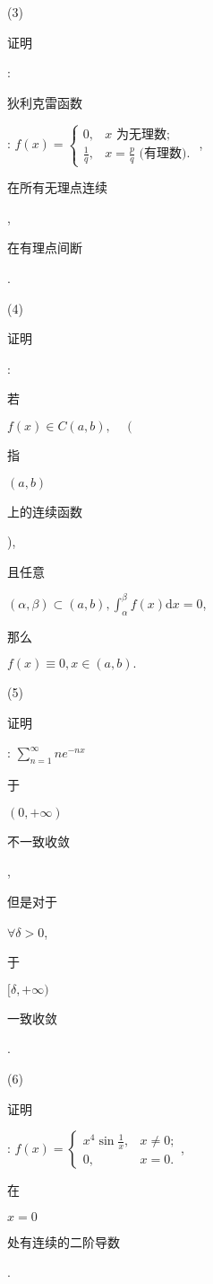 \documentclass[10pt]{article}
\begin{document}
(3) \begin{CJK}{UTF8}{mj}证明\end{CJK}: \begin{CJK}{UTF8}{mj}狄利克雷函数\end{CJK}: $f(x)=\left\{\begin{array}{ll}0, & x \text { 为无理数; } \\ \frac{1}{q}, & x=\frac{p}{q} \text { (有理数). }\end{array}\right.$, \begin{CJK}{UTF8}{mj}在所有无理点连续\end{CJK}, \begin{CJK}{UTF8}{mj}在有理点间断\end{CJK}.

(4) \begin{CJK}{UTF8}{mj}证明\end{CJK}: \begin{CJK}{UTF8}{mj}若\end{CJK} $f(x) \in C(a, b), \quad\left(\right.$ \begin{CJK}{UTF8}{mj}指\end{CJK} $(a, b)$ \begin{CJK}{UTF8}{mj}上的连续函数\end{CJK}), \begin{CJK}{UTF8}{mj}且任意\end{CJK} $(\alpha, \beta) \subset(a, b), \int_{\alpha}^{\beta} f(x) \mathrm{d} x=0$, \begin{CJK}{UTF8}{mj}那么\end{CJK} $f(x) \equiv 0, x \in(a, b) .$

(5) \begin{CJK}{UTF8}{mj}证明\end{CJK}: $\sum_{n=1}^{\infty} n e^{-n x}$ \begin{CJK}{UTF8}{mj}于\end{CJK} $(0,+\infty)$ \begin{CJK}{UTF8}{mj}不一致收敛\end{CJK}, \begin{CJK}{UTF8}{mj}但是对于\end{CJK} $\forall \delta>0$, \begin{CJK}{UTF8}{mj}于\end{CJK} $[\delta,+\infty)$ \begin{CJK}{UTF8}{mj}一致收敛\end{CJK}.

(6) \begin{CJK}{UTF8}{mj}证明\end{CJK}: $f(x)=\left\{\begin{array}{ll}x^{4} \sin \frac{1}{x}, & x \neq 0 ; \\ 0, & x=0 .\end{array}\right.$, \begin{CJK}{UTF8}{mj}在\end{CJK} $x=0$ \begin{CJK}{UTF8}{mj}处有连续的二阶导数\end{CJK}.
\end{document}

